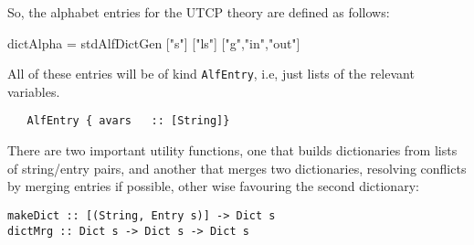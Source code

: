 So, the alphabet entries for the UTCP theory are defined as follows:
\begin{code}
dictAlpha = stdAlfDictGen ["s"] ["ls"] ["g","in","out"]
\end{code}
All of these entries will be of kind \texttt{AlfEntry},
i.e, just lists of the relevant variables.
\begin{verbatim}
   AlfEntry { avars   :: [String]}
\end{verbatim}

There are two important utility functions,
one that builds dictionaries from lists of string/entry pairs,
and another that merges two dictionaries, resolving conflicts
by merging entries if possible, other wise favouring the
second dictionary:
\begin{verbatim}
makeDict :: [(String, Entry s)] -> Dict s
dictMrg :: Dict s -> Dict s -> Dict s
\end{verbatim}